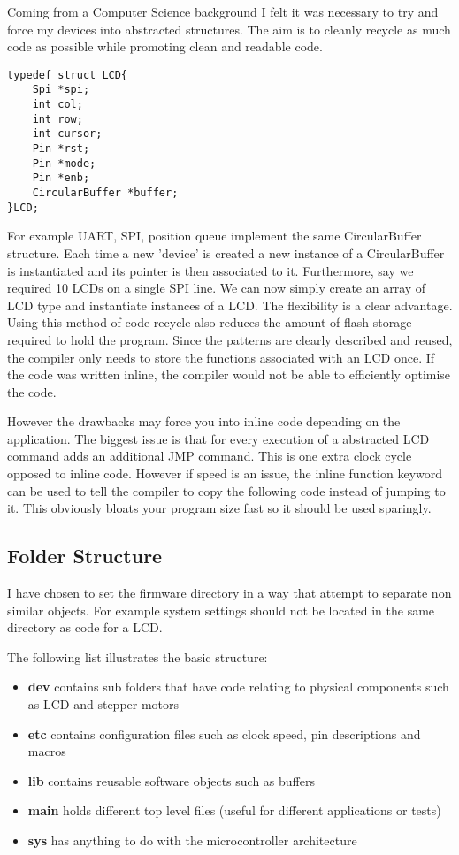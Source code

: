 \documentclass[a4paper, 11pt, twoside]{Thesis}  %
\begin{document}
Coming from a Computer Science background I felt it was necessary to try and force my devices into abstracted structures. The aim is to cleanly recycle as much code as possible while promoting clean and readable code.

\begin{lstlisting}
typedef struct LCD{
	Spi *spi;
	int col;
	int row;
	int cursor;
	Pin *rst;
	Pin *mode;
	Pin *enb;
	CircularBuffer *buffer;
}LCD;

\end{lstlisting}
For example UART, SPI, position queue implement the same CircularBuffer structure. Each time a new 'device' is created a new instance of a CircularBuffer is instantiated and its pointer is then associated to it. Furthermore, say we required 10 LCDs on a single SPI line. We can now simply create an array of LCD type and instantiate instances of a LCD. The flexibility is a clear advantage. Using this method of code recycle also reduces the amount of flash storage required to hold the program. Since the patterns are clearly described and reused, the compiler only needs to store the functions associated with an LCD once. If the code was written inline, the compiler would not be able to efficiently optimise the code.

However the drawbacks may force you into inline code depending on the application. The biggest issue is that for every execution of a abstracted LCD command adds an additional JMP command. This is one extra clock cycle opposed to inline code. However if speed is an issue, the inline function keyword can be used to tell the compiler to copy the following code instead of jumping to it. This obviously bloats your program size fast so it should be used sparingly.
\subsection{Folder Structure }

I have chosen to set the firmware directory in a way that attempt to separate non similar objects. For example system settings should not be located in the same directory as code for a LCD.

The following list illustrates the basic structure:

\begin{itemize}
\item  \textbf{dev} contains sub folders that have code relating to physical components such as LCD and stepper motors
\item  \textbf{etc} contains configuration files such as clock speed, pin descriptions and macros
\item  \textbf{lib} contains reusable software objects such as buffers
\item  \textbf{main} holds different top level files (useful for different applications or tests)
\item  \textbf{sys} has anything to do with the microcontroller architecture
\end{itemize}
 
\end{document}
